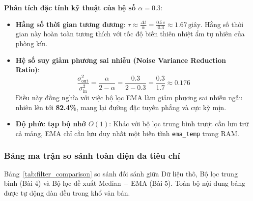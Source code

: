 \textbf{Phân tích đặc tính kỹ thuật của hệ số $\alpha = 0.3$}:
\begin{itemize}[leftmargin=*]
    \item \textbf{Hằng số thời gian tương đương}: $\tau \approx \frac{\Delta t}{\alpha} = \frac{0.5\,\text{s}}{0.3} \approx 1.67\,\text{giây}$. Hằng số thời gian này hoàn toàn tương thích với tốc độ biến thiên nhiệt ẩm tự nhiên của phòng kín.
    \item \textbf{Hệ số suy giảm phương sai nhiễu (Noise Variance Reduction Ratio)}:
    \begin{equation}
    \frac{\sigma^2_{\text{out}}}{\sigma^2_{\text{in}}} = \frac{\alpha}{2 - \alpha} = \frac{0.3}{2 - 0.3} = \frac{0.3}{1.7} \approx 0.176
    \end{equation}
    Điều này đồng nghĩa với việc bộ lọc EMA làm giảm phương sai nhiễu ngẫu nhiên lên tới \textbf{82.4\%}, mang lại đường đặc tuyến phẳng và cực kỳ mịn.
    \item \textbf{Độ phức tạp bộ nhớ $O(1)$}: Khác với bộ lọc trung bình trượt cần lưu trữ cả mảng, EMA chỉ cần lưu duy nhất một biến tĩnh \texttt{ema\_temp} trong RAM.
\end{itemize}

\vspace{0.2cm}
\subsubsection{Bảng ma trận so sánh toàn diện đa tiêu chí}
Bảng~\ref{tab:filter_comparison} so sánh đối sánh giữa Dữ liệu thô, Bộ lọc trung bình (Bài 4) và Bộ lọc đề xuất Median + EMA (Bài 5). Toàn bộ nội dung bảng được tự động dàn đều trong khổ văn bản.

